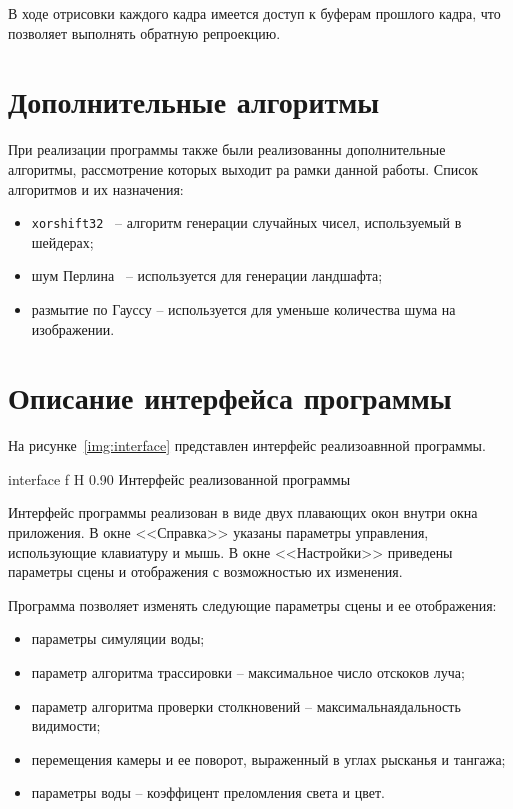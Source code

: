 В ходе отрисовки каждого кадра имеется доступ к буферам прошлого кадра,
что позволяет выполнять обратную репроекцию.

\section{Дополнительные алгоритмы}

При реализации программы также были реализованны дополнительные алгоритмы, рассмотрение 
которых выходит ра рамки данной работы. Список алгоритмов и их назначения:
\begin{itemize}
    \item \verb|xorshift32|~\cite{xorshift} -- алгоритм генерации случайных чисел, используемый в шейдерах;
    \item шум Перлина~\cite{perlin} -- используется для генерации ландшафта;
    \item размытие по Гауссу -- используется для уменьше количества шума на изображении.
\end{itemize}

\section{Описание интерфейса программы}

На рисунке~\ref{img:interface} представлен интерфейс реализоавнной программы.

    {interface}
    {f}
    {H}
    {0.90\textwidth}
    {Интерфейс реализованной программы}

Интерфейс программы реализован в виде двух плавающих окон внутри окна приложения.
В окне <<Справка>> указаны параметры управления, использующие клавиатуру и мышь.
В окне <<Настройки>> приведены параметры сцены и отображения с возможностью их изменения.

Программа позволяет изменять следующие параметры сцены и ее отображения:
\begin{itemize}
    \item параметры симуляции воды;
    \item параметр алгоритма трассировки -- максимальное число отскоков луча;
    \item параметр алгоритма проверки столкновений -- максимальнаядальность видимости;
    \item перемещения камеры и ее поворот, выраженный в углах рысканья и тангажа;
    \item параметры воды -- коэффицент преломления света и цвет.
\end{itemize}



